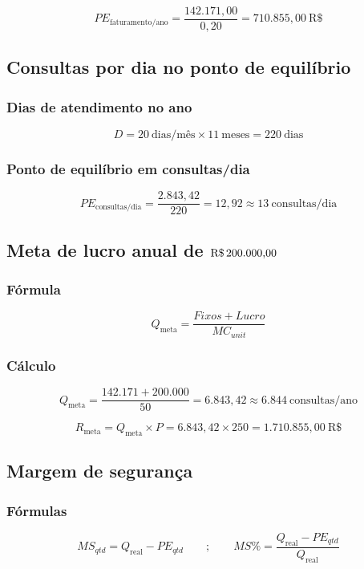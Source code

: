 \documentclass[12pt]{article}
\begin{document}
\[
PE_{\text{faturamento/ano}} = \frac{142.171{,}00}{0{,}20} = 710.855{,}00\ \text{R\$}
\]

\subsection{Consultas por dia no ponto de equilíbrio}
\label{sec:org222f8b9}

\subsubsection{Dias de atendimento no ano}
\label{sec:org51aca01}
\[
D = 20\ \text{dias/mês} \times 11\ \text{meses} = 220\ \text{dias}
\]

\subsubsection{Ponto de equilíbrio em consultas/dia}
\label{sec:orgc963d8a}
\[
PE_{\text{consultas/dia}} = \frac{2.843{,}42}{220} = 12{,}92 \approx 13\ \text{consultas/dia}
\]

\subsection{Meta de lucro anual de \(\text{R\$\,200.000,00}\)}
\label{sec:org727e215}

\subsubsection{Fórmula}
\label{sec:org4a6f2f5}
\[
Q_{\text{meta}} = \frac{Fixos + Lucro}{MC_{unit}}
\]

\subsubsection{Cálculo}
\label{sec:orgfb98572}
\[
Q_{\text{meta}} = \frac{142.171 + 200.000}{50} = 6.843{,}42 \approx 6.844\ \text{consultas/ano}
\]

\[
R_{\text{meta}} = Q_{\text{meta}} \times P = 6.843{,}42 \times 250 = 1.710.855{,}00\ \text{R\$}
\]

\subsection{Margem de segurança}
\label{sec:orgf950294}

\subsubsection{Fórmulas}
\label{sec:orgef6bafe}
\[
MS_{qtd} = Q_{\text{real}} - PE_{qtd}
\qquad;\qquad
MS\% = \frac{Q_{\text{real}} - PE_{qtd}}{Q_{\text{real}}}
\]
\end{document}
